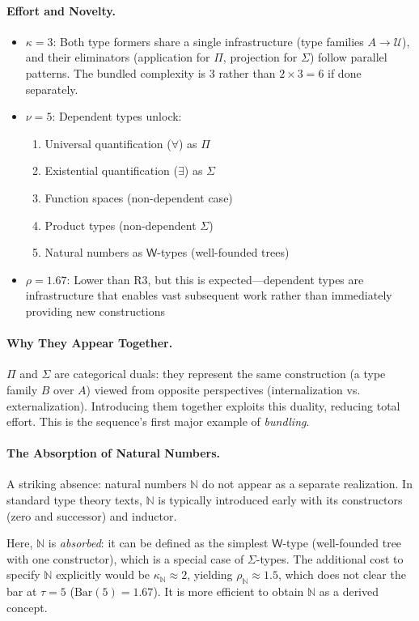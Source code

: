 \documentclass[11pt]{article}
\theoremstyle{definition}
\begin{document}
\paragraph{Effort and Novelty.}
\begin{itemize}
\item $\kappa = 3$: Both type formers share a single infrastructure (type families $A \to \mathcal{U}$), and their eliminators (application for $\Pi$, projection for $\Sigma$) follow parallel patterns. The bundled complexity is 3 rather than $2 \times 3 = 6$ if done separately.
\item $\nu = 5$: Dependent types unlock:
\begin{enumerate}
\item Universal quantification ($\forall$) as $\Pi$
\item Existential quantification ($\exists$) as $\Sigma$  
\item Function spaces (non-dependent case)
\item Product types (non-dependent $\Sigma$)
\item Natural numbers as $\mathsf{W}$-types (well-founded trees)
\end{enumerate}
\item $\rho = 1.67$: Lower than R3, but this is expected—dependent types are infrastructure that enables vast subsequent work rather than immediately providing new constructions
\end{itemize}

\paragraph{Why They Appear Together.}
$\Pi$ and $\Sigma$ are categorical duals: they represent the same construction (a type family $B$ over $A$) viewed from opposite perspectives (internalization vs. externalization). Introducing them together exploits this duality, reducing total effort. This is the sequence's first major example of \emph{bundling}.

\paragraph{The Absorption of Natural Numbers.}
A striking absence: natural numbers $\mathbb{N}$ do not appear as a separate realization. In standard type theory texts, $\mathbb{N}$ is typically introduced early with its constructors (zero and successor) and inductor.

Here, $\mathbb{N}$ is \emph{absorbed}: it can be defined as the simplest $\mathsf{W}$-type (well-founded tree with one constructor), which is a special case of $\Sigma$-types. The additional cost to specify $\mathbb{N}$ explicitly would be $\kappa_{\mathbb{N}} \approx 2$, yielding $\rho_{\mathbb{N}} \approx 1.5$, which does not clear the bar at $\tau=5$ ($\text{Bar}(5) = 1.67$). It is more efficient to obtain $\mathbb{N}$ as a derived concept.
\end{document}

